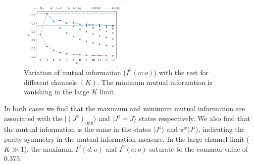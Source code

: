 \documentclass[reprint,prb,superscriptaddress]{revtex4-2}
\begin{document}
\begin{figure}[!htpb]
\includegraphics[width=0.49\textwidth]{plt/NEW31Dec_I_2_vs_Nch_[1,2]}
\caption{Variation of mutual information ($I^2(o:o)$) with the rest for different channels $(K)$. The minimum mutual inforamtion is vanishing in the large $K$ limit.}
\label{fig:MI_o_o}
\end{figure}

In both cases we find that the maximum and minimum mutual information are associated with the $|\left(J^z\right)_\mathrm{min}\rangle$ and $|J^z=J\rangle$ states respectively.
We also find that the  mutual information is the same in the states $|J^z\rangle$ and $\pi^x|J^z\rangle$, indicating the parity symmetry in the mutual information measure.
In the large channel limit ($K\gg 1$), the maximum \(I^2(d:o)\) and \(I^2(o:o)\) saturate to the common value of $0.375$.
\end{document}
